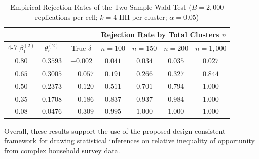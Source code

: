 \documentclass[12pt]{article}
\theoremstyle{plain}
\theoremstyle{definition}
\begin{document}
\begin{table}[ht]
\centering
\caption{Empirical Rejection Rates of the Two-Sample Wald Test
         ($B = 2{,}000$ replications per cell; $k = 4$ HH per cluster;
         $\alpha = 0.05$)}
\label{tab:sim_power}
\setlength{\tabcolsep}{6pt}
\begin{tabular}{c|c|c|cccc}
\hline
 & & & \multicolumn{4}{c}{Rejection Rate by Total Clusters $n$} \\
\cline{4-7}
$\beta_1^{(2)}$
 & $\theta_r^{(2)}$
 & True $\delta$
 & $n=100$ & $n=150$ & $n=200$ & $n=1{,}000$ \\
\hline
$0.80$ & $0.3593$ & $-0.002$ & $0.041$ & $0.034$ & $0.035$ & $0.027$ \\
$0.65$ & $0.3005$ & $\phantom{-}0.057$ & $0.191$ & $0.266$ & $0.327$ & $0.844$ \\
$0.50$ & $0.2373$ & $\phantom{-}0.120$ & $0.511$ & $0.701$ & $0.794$ & $1.000$ \\
$0.35$ & $0.1708$ & $\phantom{-}0.186$ & $0.837$ & $0.937$ & $0.984$ & $1.000$ \\
$0.08$ & $0.0476$ & $\phantom{-}0.309$ & $0.995$ & $1.000$ & $1.000$ & $1.000$ \\
\hline
\end{tabular}
\end{table}
Overall, these results support the use of the proposed design-consistent framework for drawing statistical inferences on relative inequality of opportunity from complex household survey data.


\end{document}
